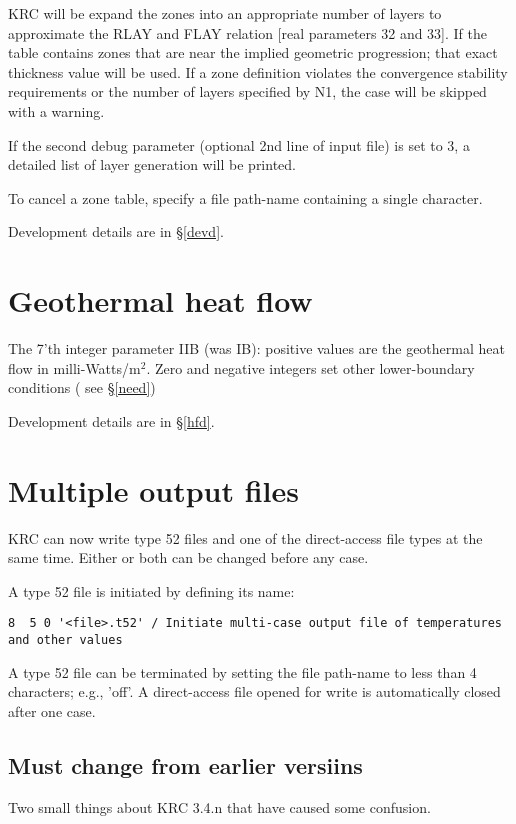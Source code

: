 \documentclass{article}
\begin{document}
KRC will be expand the zones into an appropriate number of layers to approximate
the RLAY and FLAY relation [real parameters 32 and 33]. If the table contains
zones that are near the implied geometric progression; that exact thickness
value will be used.  If a zone definition violates the convergence stability
requirements or the number of layers specified by N1, the case will be skipped
with a warning.

If the second debug parameter (optional 2nd line of input file) is set to 3, a detailed list of layer generation will be printed. 

To cancel a zone table, specify a file path-name containing a single character.

Development details are in \S \ref{devd}.

\section{Geothermal heat flow \label{ghf}}

The 7'th integer parameter IIB (was IB): positive values are the geothermal heat
flow in milli-Watts/m$^2$. Zero and negative integers set other lower-boundary
conditions ( see \S \ref{need})  

Development details are in \S \ref{hfd}.

\section{Multiple output files}
KRC can now write type 52 files and one of the direct-access file types at the same time. Either or both can be changed before any case.

A type 52 file is initiated by defining its name: 
\vspace{-3.mm} 
\begin{verbatim}
8  5 0 '<file>.t52' / Initiate multi-case output file of temperatures and other values 
\end{verbatim} 

A type 52 file can be terminated by setting the file path-name to less than 4
characters; e.g., 'off'. A direct-access file opened for write is automatically
closed after one case.

\subsection{Must change from earlier versiins}
 Two small things about KRC 3.4.n that have caused some confusion.
\end{document}
